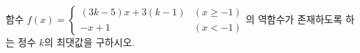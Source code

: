함수 $f(x)=\begin{cases} (3k-5)x+3(k-1) & (x\ge -1) \\ -x+1 & (x<-1) \end{cases}$의 역함수가 존재하도록 하는 정수 $k$의 최댓값을 구하시오.
